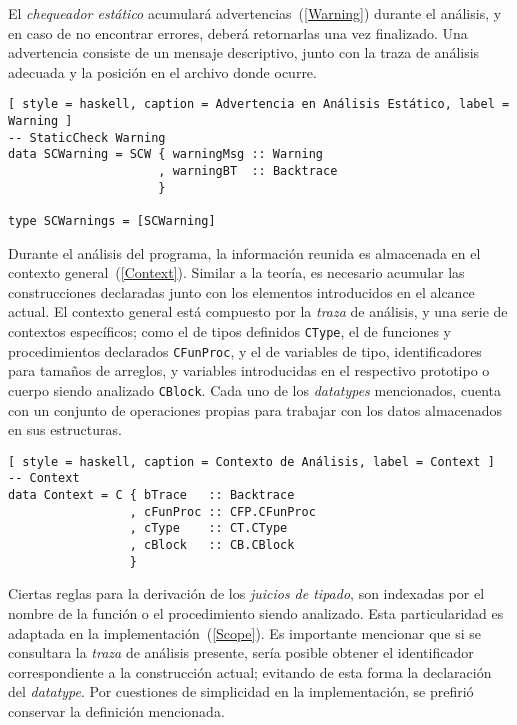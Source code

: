El \textit{chequeador estático} acumulará advertencias~(\ref{Warning}) durante el análisis, y en caso de no encontrar errores, deberá retornarlas una vez finalizado.
Una advertencia consiste de un mensaje descriptivo, junto con la traza de análisis adecuada y la posición en el archivo donde ocurre.

\begin{lstlisting}[ style = haskell, caption = Advertencia en Análisis Estático, label = Warning ]
-- StaticCheck Warning
data SCWarning = SCW { warningMsg :: Warning
                     , warningBT  :: Backtrace
                     }

type SCWarnings = [SCWarning]
\end{lstlisting}

Durante el análisis del programa, la información reunida es almacenada en el contexto general~(\ref{Context}).
Similar a la teoría, es necesario acumular las construcciones declaradas junto con los elementos introducidos en el alcance actual.
El contexto general está compuesto por la \textit{traza} de análisis, y una serie de contextos específicos; como el de tipos definidos \lstinline[style = haskell]{CType}, el de funciones y procedimientos declarados \lstinline[style = haskell]{CFunProc}, y el de variables de tipo, identificadores para tamaños de arreglos, y variables introducidas en el respectivo prototipo o cuerpo siendo analizado \lstinline[style = haskell]{CBlock}.
Cada uno de los \textit{datatypes} mencionados, cuenta con un conjunto de operaciones propias para trabajar con los datos almacenados en sus estructuras.

\begin{lstlisting}[ style = haskell, caption = Contexto de Análisis, label = Context ]
-- Context
data Context = C { bTrace   :: Backtrace
                 , cFunProc :: CFP.CFunProc
                 , cType    :: CT.CType
                 , cBlock   :: CB.CBlock
                 }
\end{lstlisting}

Ciertas reglas para la derivación de los \textit{juicios de tipado}, son indexadas por el nombre de la función o el procedimiento siendo analizado.
Esta particularidad es adaptada en la implementación~(\ref{Scope}).
Es importante mencionar que si se consultara la \textit{traza} de análisis presente, sería posible obtener el identificador correspondiente a la construcción actual; evitando de esta forma la declaración del \textit{datatype}.
Por cuestiones de simplicidad en la implementación, se prefirió conservar la definición mencionada.

